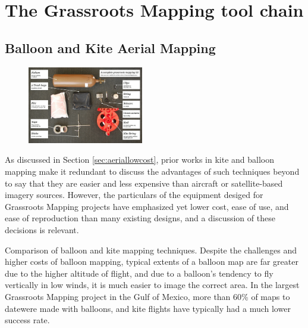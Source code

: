 \documentclass[11pt,oneside,notitlepage]{report}
\begin{document}
{{\chapter{The Grassroots Mapping tool chain}
\label{chap:toolchain}

\section{Balloon and Kite Aerial Mapping}

\begin{figure}
	\begin{flushright}
		\includegraphics[width=0.45\textwidth]{images/100-dollar-satellite-poster.jpg}
	\end{flushright}
\end{figure}

As discussed in Section \ref{sec:aeriallowcost}, prior works in kite and balloon mapping make it redundant to discuss the advantages of such techniques beyond to say that they are easier and less expensive than aircraft or satellite-based imagery sources. However, the particulars of the equipment desiged for Grassroots Mapping projects have emphasized yet lower cost, ease of use, and ease of reproduction than many existing designs, and a discussion of these decisions is relevant. 

\begin{table}[tp] 
\caption{Comparison of balloon and kite mapping techniques. Despite the challenges and higher costs of balloon mapping, typical extents of a balloon map are far greater due to the higher altitude of flight, and due to a balloon's tendency to fly vertically in low winds, it is much easier to image the correct area. In the largest Grassroots Mapping project in the Gulf of Mexico, more than 60\% of maps to datewere made with balloons, and kite flights have typically had a much lower success rate.}


\end{table}}}
\end{document}
